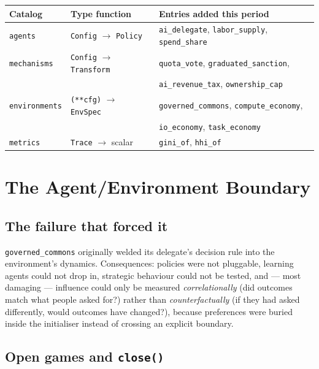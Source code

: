 \documentclass[11pt]{article}
\begin{document}
\begin{center}
\begin{tabular}{@{}lll@{}}
\toprule
\textbf{Catalog} & \textbf{Type function} & \textbf{Entries added this period} \\
\midrule
\texttt{agents} & \texttt{Config} $\to$ \texttt{Policy}
  & \texttt{ai\_delegate}, \texttt{labor\_supply}, \texttt{spend\_share} \\
\texttt{mechanisms} & \texttt{Config} $\to$ \texttt{Transform}
  & \texttt{quota\_vote}, \texttt{graduated\_sanction}, \\
  & & \texttt{ai\_revenue\_tax}, \texttt{ownership\_cap} \\
\texttt{environments} & \texttt{(**cfg)} $\to$ \texttt{EnvSpec}
  & \texttt{governed\_commons}, \texttt{compute\_economy}, \\
  & & \texttt{io\_economy}, \texttt{task\_economy} \\
\texttt{metrics} & \texttt{Trace} $\to$ scalar
  & \texttt{gini\_of}, \texttt{hhi\_of} \\
\bottomrule
\end{tabular}
\end{center}

\section{The Agent/Environment Boundary}

\subsection{The failure that forced it}

\texttt{governed\_commons} originally welded its delegate's decision rule into the
environment's dynamics. Consequences: policies were not pluggable, learning agents could
not drop in, strategic behaviour could not be tested, and --- most damaging --- influence
could only be measured \emph{correlationally} (did outcomes match what people asked for?)
rather than \emph{counterfactually} (if they had asked differently, would outcomes have
changed?), because preferences were buried inside the initialiser instead of crossing an
explicit boundary.

\subsection{Open games and \texttt{close()}}
\end{document}
